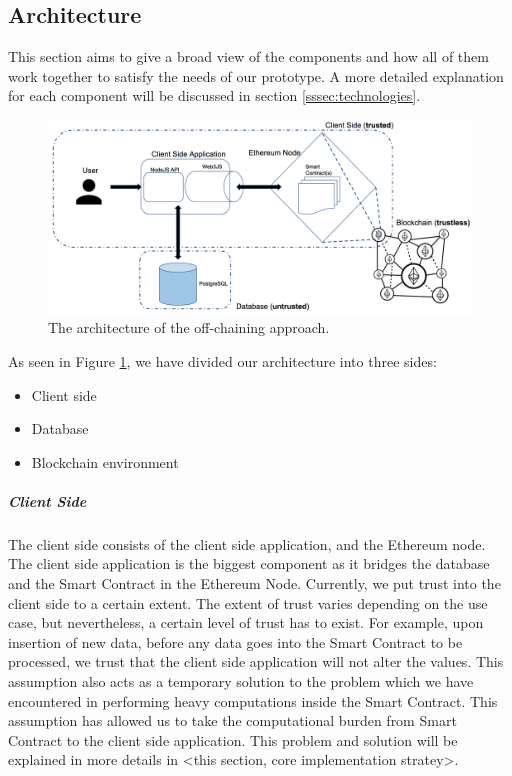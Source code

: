 \subsection{Architecture}

This section aims to give a broad view of the components and how all of them work together to satisfy the needs of our prototype. A more detailed explanation for each component will be discussed in section \ref{sssec:technologies}.

\begin{figure}[t]%
\centering
\includegraphics[width=1.0\textwidth]{images/architecture.png}
\caption{\label{fig:architecture}The architecture of the off-chaining approach.}
\end{figure}

As seen in Figure \ref{fig:architecture}, we have divided our architecture into three sides:
\begin{itemize}
\item Client side
\item Database
\item Blockchain environment
\end{itemize}

\subparagraph{Client Side}
The client side consists of the client side application, and the Ethereum node. The client side application is the biggest component as it bridges the database and the Smart Contract in the Ethereum Node. Currently, we put trust into the client side to a certain extent. The extent of trust varies depending on the use case, but nevertheless, a certain level of trust has to exist. For example, upon insertion of new data, before any data goes into the Smart Contract to be processed, we trust that the client side application will not alter the values. This assumption also acts as a temporary solution to the problem which we have encountered in performing heavy computations inside the Smart Contract. This assumption has allowed us to take the computational burden from Smart Contract to the client side application. This problem and solution will be explained in more details in <this section, core implementation stratey>.

